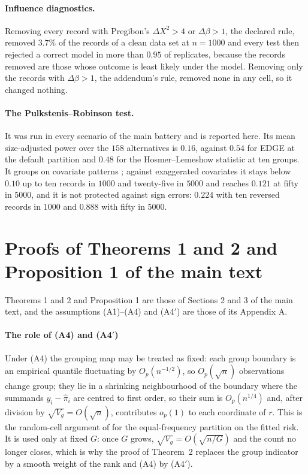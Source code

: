 \documentclass[11pt]{article}
\begin{document}
\paragraph{Influence diagnostics.} Removing every record with Pregibon's $\Delta X^2>4$ or $\Delta\beta>1$,
the declared rule, removed $3.7\%$ of the records of a clean data set at $n=1000$ and every test then
rejected a correct model in more than $0.95$ of replicates, because the records removed are those whose
outcome is least likely under the model. Removing only the records with $\Delta\beta>1$, the addendum's
rule, removed none in any cell, so it changed nothing.

\paragraph{The Pulkstenis--Robinson test.} It was run in every scenario of the main battery and is reported
here. Its mean size-adjusted power over the $158$ alternatives is $0.16$, against $0.54$ for EDGE at the
default partition and $0.48$ for the Hosmer--Lemeshow statistic at ten groups. It groups on covariate
patterns \citep{pulkstenis2002two}; against exaggerated covariates it stays below $0.10$ up to ten records
in $1000$ and twenty-five in $5000$ and reaches $0.121$ at fifty in $5000$, and it is not protected against
sign errors: $0.224$ with ten reversed records in $1000$ and
$0.888$ with fifty in $5000$.





\section{Proofs of Theorems 1 and 2 and Proposition 1 of the main text}\label{si:proof2}

Theorems 1 and 2 and Proposition 1 are those of Sections 2 and 3 of the main text, and the assumptions
(A1)--(A4) and (A4$'$) are those of its Appendix A.

\paragraph{The role of (A4) and (A4$'$)} Under (A4) the grouping map may be treated as fixed: each
group boundary is an empirical quantile fluctuating by $O_p(n^{-1/2})$, so $O_p(\sqrt n)$ observations
change group; they lie in a shrinking neighbourhood of the boundary where the summands
$y_i-\hat\pi_i$ are centred to first order, so their sum is $O_p(n^{1/4})$ and, after division by
$\sqrt{V_g}=O(\sqrt n)$, contributes $o_p(1)$ to each coordinate of $r$. This is the random-cell
argument of \citet{Moore1975} for the equal-frequency partition on the fitted risk. It is used only at
fixed $G$: once $G$ grows, $\sqrt{V_g}=O(\sqrt{n/G})$ and the count no longer closes, which is why the
proof of Theorem~2 replaces the group indicator by a smooth weight of the rank and (A4) by (A4$'$).
\end{document}
